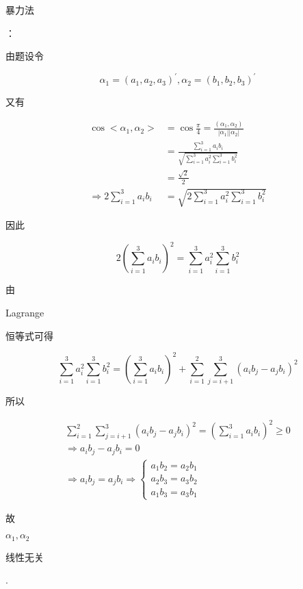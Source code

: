 \documentclass[10pt]{article}
\begin{document}
\begin{CJK}{UTF8}{mj}暴力法\end{CJK}：\begin{CJK}{UTF8}{mj}由题设令\end{CJK}
$$
\alpha_{1}=\left(a_{1}, a_{2}, a_{3}\right)^{\prime}, \alpha_{2}=\left(b_{1}, b_{2}, b_{3}\right)^{\prime}
$$
\begin{CJK}{UTF8}{mj}又有\end{CJK}
$$
\begin{aligned}
\cos <\alpha_{1}, \alpha_{2}>&=\cos \frac{\pi}{4}=\frac{\left(\alpha_{1}, \alpha_{2}\right)}{\left|\alpha_{1}\right|\left|\alpha_{2}\right|} \\
&=\frac{\sum_{i=1}^{3} a_{i} b_{i}}{\sqrt{\sum_{i=1}^{3} a_{i}^{2} \sum_{i=1}^{3} b_{i}^{2}}} \\
&=\frac{\sqrt{2}}{2} \\
\Rightarrow 2 \sum_{i=1}^{3} a_{i} b_{i} &=\sqrt{2 \sum_{i=1}^{3} a_{i}^{2} \sum_{i=1}^{3} b_{i}^{2}}
\end{aligned}
$$
\begin{CJK}{UTF8}{mj}因此\end{CJK}
$$
2\left(\sum_{i=1}^{3} a_{i} b_{i}\right)^{2}=\sum_{i=1}^{3} a_{i}^{2} \sum_{i=1}^{3} b_{i}^{2}
$$
\begin{CJK}{UTF8}{mj}由\end{CJK} Lagrange \begin{CJK}{UTF8}{mj}恒等式可得\end{CJK}
$$
\sum_{i=1}^{3} a_{i}^{2} \sum_{i=1}^{3} b_{i}^{2}=\left(\sum_{i=1}^{3} a_{i} b_{i}\right)^{2}+\sum_{i=1}^{2} \sum_{j=i+1}^{3}\left(a_{i} b_{j}-a_{j} b_{i}\right)^{2}
$$
\begin{CJK}{UTF8}{mj}所以\end{CJK}
$$
\begin{gathered}
\sum_{i=1}^{2} \sum_{j=i+1}^{3}\left(a_{i} b_{j}-a_{j} b_{i}\right)^{2}=\left(\sum_{i=1}^{3} a_{i} b_{i}\right)^{2} \geq 0 \\
\Rightarrow a_{i} b_{j}-a_{j} b_{i}=0 \\
\Rightarrow a_{i} b_{j}=a_{j} b_{i} \Rightarrow\left\{\begin{array}{l}
a_{1} b_{2}=a_{2} b_{1} \\
a_{2} b_{3}=a_{3} b_{2} \\
a_{1} b_{3}=a_{3} b_{1}
\end{array}\right.
\end{gathered}
$$
\begin{CJK}{UTF8}{mj}故\end{CJK} $\alpha_{1}, \alpha_{2}$ \begin{CJK}{UTF8}{mj}线性无关\end{CJK}.
\end{document}
